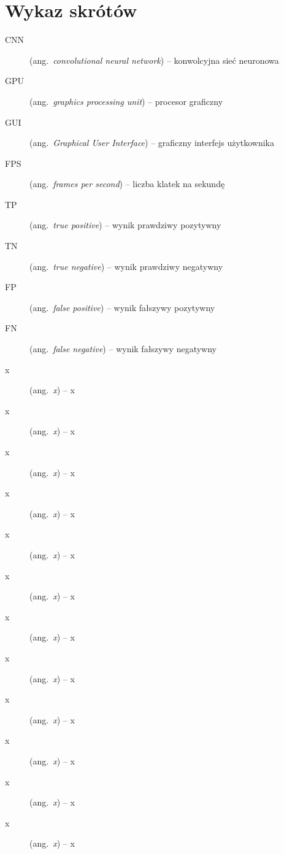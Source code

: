 % 
\chapter*{Wykaz skrótów}
\label{sec:skroty}
\noindent\vspace{-\topsep-\partopsep-\parsep}
\begin{description}
      \item [CNN] (ang.\ \emph{convolutional neural network}) -- konwolcyjna sieć neuronowa

  \item [GPU] (ang.\ \emph{graphics processing unit}) -- procesor graficzny

  \item [GUI] (ang.\ \emph{Graphical User Interface}) -- graficzny interfejs użytkownika

   \item [FPS] (ang.\ \emph{frames per second}) -- liczba klatek na sekundę   
  
  \item [TP] (ang.\ \emph{true positive}) -- wynik prawdziwy pozytywny

  \item [TN] (ang.\ \emph{true negative}) -- wynik prawdziwy negatywny

  \item [FP] (ang.\ \emph{false positive}) -- wynik fałszywy pozytywny

  \item [FN] (ang.\ \emph{false negative}) -- wynik fałszywy negatywny

 


  \item [x] (ang.\ \emph{x}) -- x

  \item [x] (ang.\ \emph{x}) -- x

  \item [x] (ang.\ \emph{x}) -- x

  \item [x] (ang.\ \emph{x}) -- x

  \item [x] (ang.\ \emph{x}) -- x

  \item [x] (ang.\ \emph{x}) -- x

  \item [x] (ang.\ \emph{x}) -- x

  \item [x] (ang.\ \emph{x}) -- x

  \item [x] (ang.\ \emph{x}) -- x

  \item [x] (ang.\ \emph{x}) -- x

  \item [x] (ang.\ \emph{x}) -- x

  \item [x] (ang.\ \emph{x}) -- x

\end{description}
